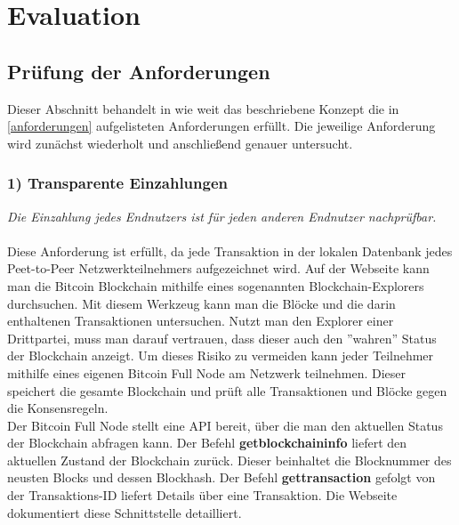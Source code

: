 \section{Evaluation}
\subsection{Prüfung der Anforderungen}\label{btc_evaluation}%

Dieser Abschnitt behandelt in wie weit das beschriebene Konzept die in \ref{anforderungen} aufgelisteten Anforderungen erfüllt. Die jeweilige Anforderung wird zunächst wiederholt und anschließend genauer untersucht.

\subsubsection{1) Transparente Einzahlungen}
\textit{Die Einzahlung jedes Endnutzers ist für jeden anderen Endnutzer nachprüfbar.}\\\\
Diese Anforderung ist erfüllt, da jede Transaktion in der lokalen Datenbank jedes Peet-to-Peer Netzwerkteilnehmers aufgezeichnet wird. 
Auf der Webseite \cite{blockchain_info} kann man die Bitcoin Blockchain mithilfe eines sogenannten Blockchain-Explorers durchsuchen. Mit diesem Werkzeug kann man die Blöcke und die darin enthaltenen Transaktionen untersuchen. Nutzt man den Explorer einer Drittpartei, muss man darauf vertrauen, dass dieser auch den ''wahren'' Status der Blockchain anzeigt. Um dieses Risiko zu vermeiden kann jeder Teilnehmer mithilfe eines eigenen Bitcoin Full Node am Netzwerk teilnehmen. Dieser speichert die gesamte Blockchain und prüft alle Transaktionen und Blöcke gegen die Konsensregeln.\\
Der Bitcoin Full Node stellt eine API bereit, über die man den aktuellen Status der Blockchain abfragen kann. Der Befehl \textbf{getblockchaininfo} liefert den aktuellen Zustand der Blockchain zurück. Dieser beinhaltet die Blocknummer des neusten Blocks und dessen Blockhash. Der Befehl \textbf{gettransaction} gefolgt von der Transaktions-ID liefert Details über eine Transaktion. Die Webseite \cite{btc_api} dokumentiert diese Schnittstelle detailliert. 

